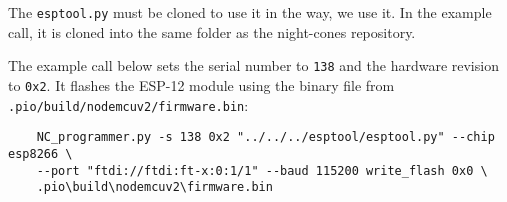 The \texttt{esptool.py} must be cloned to use it in the way, we use it. In the example call, it is cloned into the same folder as the night-cones repository. 

The example call below sets the serial number to \texttt{138} and the hardware revision to \texttt{0x2}. It flashes the ESP-12 module using the binary file from \texttt{.pio/build/nodemcuv2/firmware.bin}:
\begin{verbatim}
	NC_programmer.py -s 138 0x2 "../../../esptool/esptool.py" --chip esp8266 \
	--port "ftdi://ftdi:ft-x:0:1/1" --baud 115200 write_flash 0x0 \
	.pio\build\nodemcuv2\firmware.bin
\end{verbatim}

